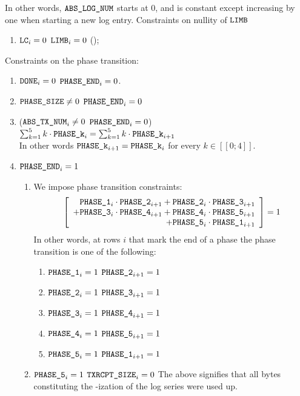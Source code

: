 In other words, $\texttt{ABS\_LOG\_NUM}$ starts at 0, and is constant except increasing by one when starting a new log entry.
Constraints on nullity of $\texttt{LIMB}$
\begin{enumerate}[resume]
    \item \If $\texttt{LC}_{i}=0$ \Then $\texttt{LIMB}_{i}=0$ (\trash);
\end{enumerate}
Constraints on the phase transition:
\begin{enumerate}[resume]
    \item \If $\texttt{DONE}_{i}=0$ \Then $\texttt{PHASE\_END}_{i}=0$.
    \item \If $\texttt{PHASE\_SIZE} \neq 0$ \Then $\texttt{PHASE\_END}_{i}=0$
    \item \If ($\texttt{ABS\_TX\_NUM}_{i} \neq 0$ \et $\texttt{PHASE\_END}_{i}=0$) \Then $\sum_{k=1}^{5} k \cdot \texttt{PHASE\_k}_{i} = \sum_{k=1}^{5} k \cdot \texttt{PHASE\_k}_{i+1}$                             \\
        In other words $\texttt{PHASE\_k}_{i+1}=\texttt{PHASE\_k}_{i}$ for every $k \in [\![ 0 ; 4 ]\!]$.
    \item \If $\texttt{PHASE\_END}_{i}=1$ \Then
        \begin{enumerate}
            \item We impose phase transition constraints:
                \[
                    \left[
                        \begin{array}{r}
                            \texttt{PHASE\_1}_{i} \cdot \texttt{PHASE\_2}_{i+1}
                            + \texttt{PHASE\_2}_{i} \cdot \texttt{PHASE\_3}_{i+1} \\
                            + \texttt{PHASE\_3}_{i} \cdot \texttt{PHASE\_4}_{i+1}
                            + \texttt{PHASE\_4}_{i} \cdot \texttt{PHASE\_5}_{i+1} \\
                            + \texttt{PHASE\_5}_{i} \cdot \texttt{PHASE\_1}_{i+1} \\
                        \end{array}
                        \right]
                    = 1
                \]
                In other words, at rows $i$ that mark the end of a phase the phase transition is one of the following:
                \begin{enumerate}
                    \item \If $\texttt{PHASE\_1}_{i}=1$ \Then $\texttt{PHASE\_2}_{i+1}=1$
                    \item \If $\texttt{PHASE\_2}_{i}=1$ \Then $\texttt{PHASE\_3}_{i+1}=1$
                    \item \If $\texttt{PHASE\_3}_{i}=1$ \Then $\texttt{PHASE\_4}_{i+1}=1$
                    \item \If $\texttt{PHASE\_4}_{i}=1$ \Then $\texttt{PHASE\_5}_{i+1}=1$
                    \item \If $\texttt{PHASE\_5}_{i}=1$ \Then $\texttt{PHASE\_1}_{i+1}=1$
                \end{enumerate}
            \item \If $\texttt{PHASE\_5}_{i}=1$ \Then $\texttt{TXRCPT\_SIZE}_{i}=0$
                The above signifies that all bytes constituting the \rlp{}-ization of the log series were used up.
        \end{enumerate}
\end{enumerate}

